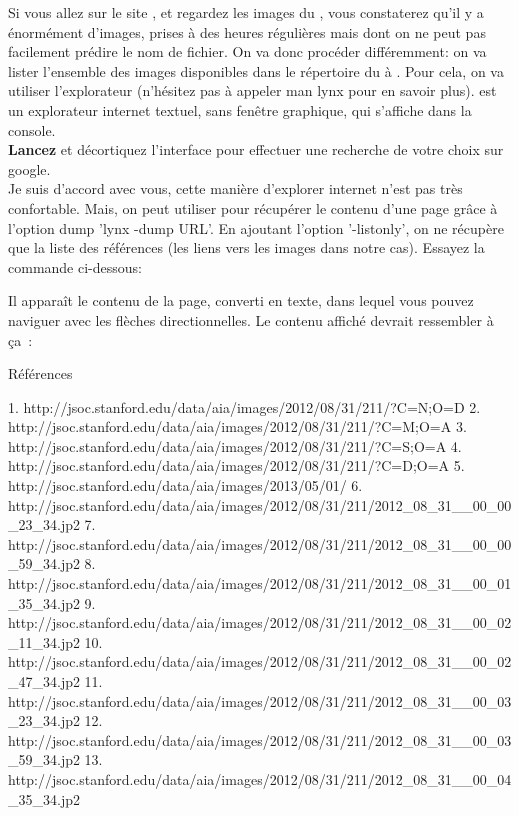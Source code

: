 Si vous allez sur le site \urlsoleil, et regardez les images du \datesoleil, vous constaterez qu'il y a énormément d'images, prises à des heures régulières mais dont on ne peut pas facilement prédire le nom de fichier. On va donc procéder différemment: on va lister l'ensemble des images disponibles dans le répertoire du \datesoleil à \lambdasoleil. Pour cela, on va utiliser l'explorateur \lynx (n'hésitez pas à appeler man lynx pour en savoir plus). \lynx est un explorateur internet textuel, sans fenêtre graphique, qui s'affiche dans la console.\\

\textbf{Lancez} \lynx et décortiquez l'interface pour effectuer une recherche de votre choix sur google.\\

Je suis d'accord avec vous, cette manière d'explorer internet n'est pas très confortable. Mais, on peut utiliser \lynx pour récupérer le contenu d'une page grâce à l'option dump 'lynx -dump URL'. En ajoutant l'option '-listonly', on ne récupère que la liste des références (les liens vers les images dans notre cas). Essayez la commande ci-dessous:
\begin{center}
\end{center}
Il apparaît le contenu de la page, converti en texte, dans lequel vous pouvez naviguer avec les flèches directionnelles. Le contenu affiché devrait ressembler à ça~:
\begin{exempleResultat}
Références

   1. http://jsoc.stanford.edu/data/aia/images/2012/08/31/211/?C=N;O=D
   2. http://jsoc.stanford.edu/data/aia/images/2012/08/31/211/?C=M;O=A
   3. http://jsoc.stanford.edu/data/aia/images/2012/08/31/211/?C=S;O=A
   4. http://jsoc.stanford.edu/data/aia/images/2012/08/31/211/?C=D;O=A
   5. http://jsoc.stanford.edu/data/aia/images/2013/05/01/
   6. http://jsoc.stanford.edu/data/aia/images/2012/08/31/211/2012\_08\_31\_\_00\_00\_23\_34.jp2
   7. http://jsoc.stanford.edu/data/aia/images/2012/08/31/211/2012\_08\_31\_\_00\_00\_59\_34.jp2
   8. http://jsoc.stanford.edu/data/aia/images/2012/08/31/211/2012\_08\_31\_\_00\_01\_35\_34.jp2
   9. http://jsoc.stanford.edu/data/aia/images/2012/08/31/211/2012\_08\_31\_\_00\_02\_11\_34.jp2
  10. http://jsoc.stanford.edu/data/aia/images/2012/08/31/211/2012\_08\_31\_\_00\_02\_47\_34.jp2
  11. http://jsoc.stanford.edu/data/aia/images/2012/08/31/211/2012\_08\_31\_\_00\_03\_23\_34.jp2
  12. http://jsoc.stanford.edu/data/aia/images/2012/08/31/211/2012\_08\_31\_\_00\_03\_59\_34.jp2
  13. http://jsoc.stanford.edu/data/aia/images/2012/08/31/211/2012\_08\_31\_\_00\_04\_35\_34.jp2
 \end{exempleResultat}

